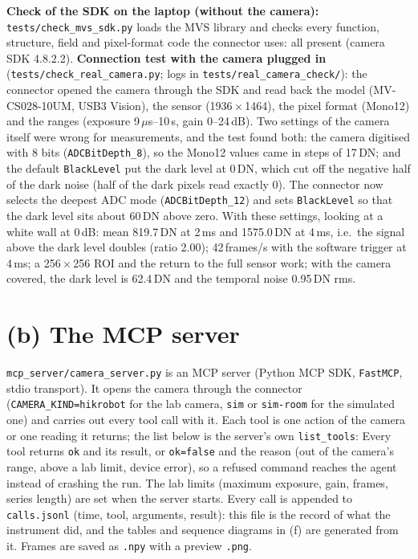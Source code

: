 \documentclass[11pt,a4paper]{article}
\begin{document}
\textbf{Check of the SDK on the laptop (without the camera):} \texttt{tests/check\_mvs\_sdk.py} loads the MVS library and
checks every function, structure, field and pixel-format code the connector uses: all present (camera SDK 4.8.2.2).
\textbf{Connection test with the camera plugged in} (\texttt{tests/check\_real\_camera.py}; logs in
\texttt{tests/real\_camera\_check/}): the connector opened the camera through the SDK and read back the model
(MV-CS028-10UM, USB3 Vision), the sensor (1936\,$\times$\,1464), the pixel format (Mono12) and the ranges (exposure
9\,$\mu$s--10\,s, gain 0--24\,dB). Two settings of the camera itself were wrong for measurements, and the test found
both: the camera digitised with 8 bits (\texttt{ADCBitDepth\_8}), so the Mono12 values came in steps of 17\,DN; and the
default \texttt{BlackLevel} put the dark level at 0\,DN, which cut off the negative half of the dark noise (half of the
dark pixels read exactly 0). The connector now selects the deepest ADC mode (\texttt{ADCBitDepth\_12}) and sets
\texttt{BlackLevel} so that the dark level sits about 60\,DN above zero. With these settings, looking at a white wall at
0\,dB: mean 819.7\,DN at 2\,ms and 1575.0\,DN at 4\,ms, i.e.\ the signal above the dark level doubles (ratio 2.00);
42\,frames/s with the software trigger at 4\,ms; a 256\,$\times$\,256 ROI and the return to the full sensor work; with
the camera covered, the dark level is 62.4\,DN and the temporal noise 0.95\,DN rms.

\section*{(b) The MCP server}
\texttt{mcp\_server/camera\_server.py} is an MCP server (Python MCP SDK, \texttt{FastMCP}, stdio transport). It opens the
camera through the connector (\texttt{CAMERA\_KIND=hikrobot} for the lab camera, \texttt{sim} or \texttt{sim-room} for the
simulated one) and
carries out every tool call with it. Each tool is one action of the camera or one reading it returns; the list below is the
server's own \texttt{list\_tools}:
{\small}
Every tool returns \texttt{ok} and its result, or \texttt{ok=false} and the reason (out of the camera's range, above a
lab limit, device error), so a refused command reaches the agent instead of crashing the run. The lab limits (maximum
exposure, gain, frames, series length) are set when the server starts. Every call is appended to \texttt{calls.jsonl}
(time, tool, arguments, result): this file is the record of what the instrument did, and the tables and sequence diagrams
in (f) are generated from it. Frames are saved as \texttt{.npy} with a preview \texttt{.png}.
\end{document}
